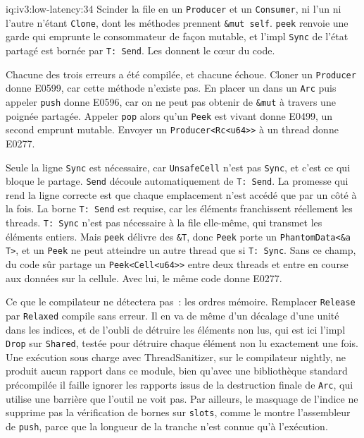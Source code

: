 \begin{solution}{iq:iv3:low-latency:34}
Scinder la file en un \texttt{Producer} et un \texttt{Consumer}, ni l'un ni l'autre n'étant \texttt{Clone}, dont les méthodes prennent \texttt{\&mut self}. \texttt{peek} renvoie une garde qui emprunte le consommateur de façon mutable, et l'impl \texttt{Sync} de l'état partagé est bornée par \texttt{T: Send}. Les  donnent le cœur du code.
\label{lst:iv3:ll:split}
\enlargethispage{-3\baselineskip}%
\label{lst:iv3:ll:peek}

Chacune des trois erreurs a été compilée, et chacune échoue. Cloner un \texttt{Producer} donne E0599, car cette méthode n'existe pas. En placer un dans un \texttt{Arc} puis appeler \texttt{push} donne E0596, car on ne peut pas obtenir de \texttt{\&mut} à travers une poignée partagée. Appeler \texttt{pop} alors qu'un \texttt{Peek} est vivant donne E0499, un second emprunt mutable. Envoyer un \texttt{Producer<Rc<u64>{}>} à un thread donne E0277.

Seule la ligne \texttt{Sync} est nécessaire, car \texttt{UnsafeCell} n'est pas \texttt{Sync}, et c'est ce qui bloque le partage. \texttt{Send} découle automatiquement de \texttt{T: Send}. La promesse qui rend la ligne correcte est que chaque emplacement n'est accédé que par un côté à la fois. La borne \texttt{T: Send} est requise, car les éléments franchissent réellement les threads. \texttt{T: Sync} n'est pas nécessaire à la file elle-même, qui transmet les éléments entiers. Mais \texttt{peek} délivre des \texttt{\&T}, donc \texttt{Peek} porte un \texttt{PhantomData<\&\textquotesingle a T>}, et un \texttt{Peek} ne peut atteindre un autre thread que si \texttt{T: Sync}. Sans ce champ, du code sûr partage un \texttt{Peek<Cell<u64>{}>} entre deux threads et entre en course aux données sur la cellule. Avec lui, le même code donne E0277.

Ce que le compilateur ne détectera pas~: les ordres mémoire. Remplacer \texttt{Release} par \texttt{Relaxed} compile sans erreur. Il en va de même d'un décalage d'une unité dans les indices, et de l'oubli de détruire les éléments non lus, qui est ici l'impl \texttt{Drop} sur \texttt{Shared}, testée pour détruire chaque élément non lu exactement une fois. Une exécution sous charge avec ThreadSanitizer, sur le compilateur nightly, ne produit aucun rapport dans ce module, bien qu'avec une bibliothèque standard précompilée il faille ignorer les rapports issus de la destruction finale de \texttt{Arc}, qui utilise une barrière que l'outil ne voit pas. Par ailleurs, le masquage de l'indice ne supprime pas la vérification de bornes sur \texttt{slots}, comme le montre l'assembleur de \texttt{push}, parce que la longueur de la tranche n'est connue qu'à l'exécution.

\end{solution}

